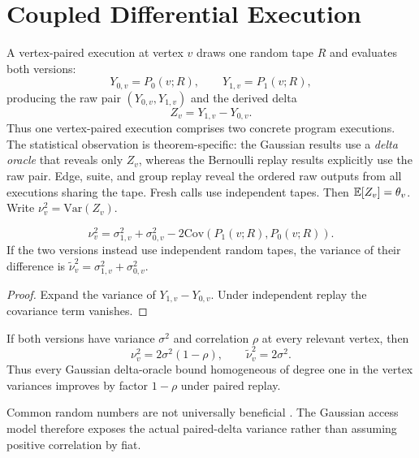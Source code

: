 \section{Coupled Differential Execution}
\label{sec:coupled}

A vertex-paired execution at vertex $v$ draws one random tape $R$ and evaluates both
versions:
\[
Y_{0,v}=P_0(v;R),\qquad Y_{1,v}=P_1(v;R),
\]
producing the raw pair $(Y_{0,v},Y_{1,v})$ and the derived delta
\[
Z_v=Y_{1,v}-Y_{0,v}.
\]
Thus one vertex-paired execution comprises two concrete program executions.
The statistical observation is theorem-specific: the Gaussian results use a
\emph{delta oracle} that reveals only $Z_v$, whereas the Bernoulli replay
results explicitly use the raw pair.  Edge, suite, and group replay reveal the
ordered raw outputs from all executions sharing the tape.  Fresh calls use
independent tapes.  Then $\mathbb{E}[Z_v]=\theta_v$.  Write
$\nu_v^2=\mathrm{Var}(Z_v)$.

\begin{proposition}
\label{prop:diffvar}
\[
\nu_v^2
=
\sigma_{1,v}^2+\sigma_{0,v}^2
-2\mathrm{Cov}(P_1(v;R),P_0(v;R)).
\]
If the two versions instead use independent random tapes, the variance of their
difference is $\widetilde\nu_v^2=\sigma_{1,v}^2+\sigma_{0,v}^2$.
\end{proposition}

\begin{proof}
Expand the variance of $Y_{1,v}-Y_{0,v}$.  Under independent replay the covariance
term vanishes.
\end{proof}

\begin{corollary}
If both versions have variance $\sigma^2$ and correlation $\rho$ at every relevant
vertex, then
\[
\nu_v^2=2\sigma^2(1-\rho),
\qquad
\widetilde\nu_v^2=2\sigma^2.
\]
Thus every Gaussian delta-oracle bound homogeneous of degree one in the vertex
variances improves by factor $1-\rho$ under paired replay.
\end{corollary}

Common random numbers are not universally beneficial \cite{GlassermanYao1992}.
The Gaussian access model therefore exposes the actual paired-delta variance rather than
assuming positive correlation by fiat.
